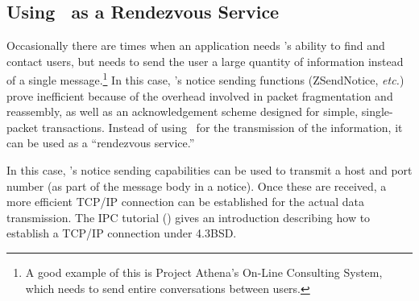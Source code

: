 %
\subsection{Using \Zephyr\ as a Rendezvous Service}
\label{rendezvous-service}

Occasionally there are times when an application needs \Zephyr's
ability to find and contact users, but needs to send the user a large
quantity of information instead of a single message.\footnote{A good
example of this is Project Athena's On-Line Consulting System, which
needs to send entire conversations between users.}  In this case,
\Zephyr's notice sending functions (ZSendNotice, {\em etc.\/}) prove
inefficient because of the overhead involved in packet fragmentation and
reassembly, as well as an acknowledgement scheme designed for simple,
single-packet transactions.  Instead of using \Zephyr\ for the
transmission of the information, it can be used as a ``rendezvous
service.''

In this case, \Zephyr's notice sending capabilities can be used to
transmit a host and port number (as part of the message body in a
notice).  Once these are received, a more efficient TCP/IP connection
can be established for the actual data transmission.  The IPC tutorial
(\cite{ipc-tutorial}) gives an introduction describing how to establish
a TCP/IP connection under 4.3BSD.

